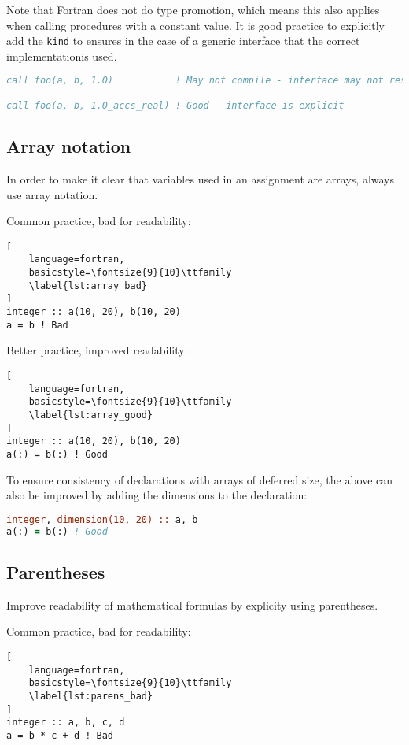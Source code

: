 \documentclass[11pt]{report}
\begin{document}
Note that Fortran does not do type promotion, which means this also applies when calling procedures with a
constant value. It is good practice to explicitly add the \texttt{kind} to ensures in the case of a generic 
interface that the correct implementationis used.
\begin{lstlisting}[language=fortran, basicstyle=\fontsize{9}{10}\ttfamily]
call foo(a, b, 1.0)           ! May not compile - interface may not resolve

call foo(a, b, 1.0_accs_real) ! Good - interface is explicit
\end{lstlisting}

\subsection{Array notation}
In order to make it clear that variables used in an assignment are arrays, always use array notation.

Common practice, bad for readability:
\begin{lstlisting}[
	language=fortran,
    basicstyle=\fontsize{9}{10}\ttfamily
    \label{lst:array_bad}
]
integer :: a(10, 20), b(10, 20)
a = b ! Bad
\end{lstlisting}

Better practice, improved readability:
\begin{lstlisting}[
	language=fortran,
    basicstyle=\fontsize{9}{10}\ttfamily
    \label{lst:array_good}
]
integer :: a(10, 20), b(10, 20)
a(:) = b(:) ! Good
\end{lstlisting}

To ensure consistency of declarations with arrays of deferred size, the above can also be improved
by adding the dimensions to the declaration:
\begin{lstlisting}[language=fortran,basicstyle=\fontsize{9}{10}\ttfamily\label{lst:array_good_decl}
]
integer, dimension(10, 20) :: a, b
a(:) = b(:) ! Good
\end{lstlisting}

\subsection{Parentheses}
Improve readability of mathematical formulas by explicity using parentheses.

Common practice, bad for readability:
\begin{lstlisting}[
	language=fortran,
    basicstyle=\fontsize{9}{10}\ttfamily
    \label{lst:parens_bad}
]
integer :: a, b, c, d
a = b * c + d ! Bad
\end{lstlisting}
\end{document}
